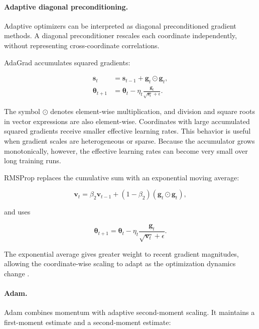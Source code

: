 \paragraph{Adaptive diagonal preconditioning.}
Adaptive optimizers can be interpreted as diagonal preconditioned
gradient methods. A diagonal preconditioner rescales each coordinate
independently, without representing cross-coordinate correlations.

AdaGrad accumulates squared gradients:

\begin{align}
    \mathbf{s}_t
    &=
    \mathbf{s}_{t-1}
    +
    \mathbf{g}_t\odot\mathbf{g}_t,
    \label{eq:opt-adagrad-state}\\
    \boldsymbol{\theta}_{t+1}
    &=
    \boldsymbol{\theta}_t
    -
    \eta_t
    \frac{\mathbf{g}_t}{\sqrt{\mathbf{s}_t}+\epsilon}.
    \label{eq:opt-adagrad-update}
\end{align}

The symbol $\odot$ denotes element-wise multiplication, and division and
square roots in vector expressions are also element-wise. Coordinates
with large accumulated squared gradients receive smaller effective
learning rates. This behavior is useful when gradient scales are
heterogeneous or sparse. Because the accumulator grows monotonically,
however, the effective learning rates can become very small over long
training runs.

RMSProp replaces the cumulative sum with an exponential moving average:

\begin{equation}
    \mathbf{v}_t
    =
    \beta_2\mathbf{v}_{t-1}
    +(1-\beta_2)(\mathbf{g}_t\odot\mathbf{g}_t),
    \label{eq:opt-rmsprop-state}
\end{equation}

and uses

\begin{equation}
    \boldsymbol{\theta}_{t+1}
    =
    \boldsymbol{\theta}_t
    -
    \eta_t
    \frac{\mathbf{g}_t}{\sqrt{\mathbf{v}_t}+\epsilon}.
    \label{eq:opt-rmsprop-update}
\end{equation}

The exponential average gives greater weight to recent gradient
magnitudes, allowing the coordinate-wise scaling to adapt as the
optimization dynamics change \parencite{Ranganath2026Navigating}.

\paragraph{Adam.}
Adam combines momentum with adaptive second-moment scaling. It maintains
a first-moment estimate and a second-moment estimate:

